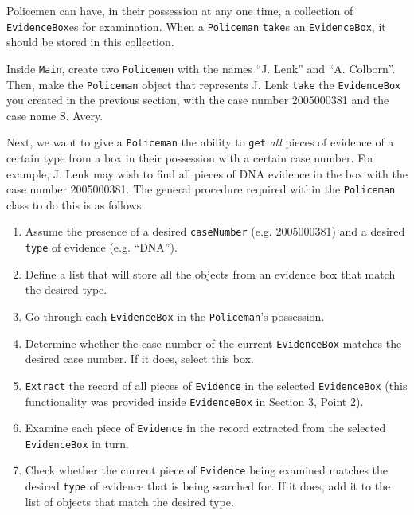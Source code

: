 \documentclass[11pt]{article}
\begin{document}
Policemen can have, in their possession at any one time, a collection of \texttt{EvidenceBox}es for examination. When a \texttt{Policeman} \texttt{take}s an \texttt{EvidenceBox}, it should be stored in this collection. 

Inside \texttt{Main}, create two \texttt{Policemen} with the names ``J. Lenk'' and ``A. Colborn''. Then, make the \texttt{Policeman} object that represents J. Lenk \texttt{take} the \texttt{EvidenceBox} you created in the previous section, with the case number 2005000381 and the case name S. Avery.

Next, we want to give a \texttt{Policeman} the ability to \texttt{get} \emph{all} pieces of evidence of a certain type from a box in their possession with a certain case number. For example, J. Lenk may wish to find all pieces of DNA evidence in the box with the case number 2005000381. The general procedure required within the \texttt{Policeman} class to do this is as follows:

\begin{enumerate}
	
	\item Assume the presence of a desired \texttt{caseNumber} (e.g. 2005000381) and a desired \texttt{type} of evidence (e.g. ``DNA'').

	\item Define a list that will store all the objects from an evidence box that match the desired type.
	
	\item Go through each \texttt{EvidenceBox} in the \texttt{Policeman}'s possession.
	
	\item Determine whether the case number of the current \texttt{EvidenceBox} matches the desired case number. If it does, select this box.
	
	\item \texttt{Extract} the record of all pieces of \texttt{Evidence} in the selected \texttt{EvidenceBox} (this functionality was provided inside \texttt{EvidenceBox} in Section 3, Point 2). 
	
	\item Examine each piece of \texttt{Evidence} in the record extracted from the selected \texttt{EvidenceBox} in turn.
	
	\item Check whether the current piece of \texttt{Evidence} being examined matches the desired \texttt{type} of evidence that is being searched for. If it does, add it to the list of objects that match the desired type.
	
\end{enumerate}
\end{document}
